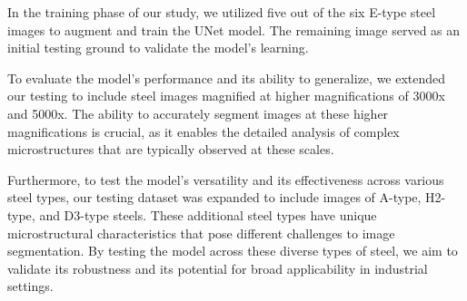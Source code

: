\documentclass[]{article}
\begin{document}
In the training phase of our study, we utilized five out of the six E-type steel images to augment and train the UNet model. The remaining image served as an initial testing ground to validate the model's learning.

To evaluate the model's performance and its ability to generalize, we extended our testing to include steel images magnified at higher magnifications of 3000x and 5000x. The ability to accurately segment images at these higher magnifications is crucial, as it enables the detailed analysis of complex microstructures that are typically observed at these scales.

Furthermore, to test the model's versatility and its effectiveness across various steel types, our testing dataset was expanded to include images of A-type, H2-type, and D3-type steels. These additional steel types have unique microstructural characteristics that pose different challenges to image segmentation. By testing the model across these diverse types of steel, we aim to validate its robustness and its potential for broad applicability in industrial settings.




\end{document}
